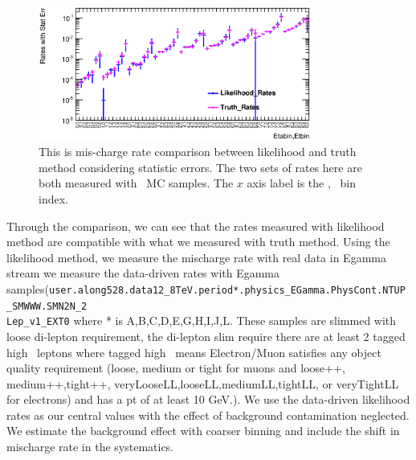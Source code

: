 \begin{figure}[htp]
\centering
\includegraphics[width=0.8\textwidth]{figures/ChargeMisID/LL_TR_Com.eps}
\caption{This is mis-charge rate comparison between likelihood and
  truth method considering statistic errors. The two sets of rates
  here are both measured with \Zee\ MC samples. The $x$ axis label is
  the \eta, \pt\ bin index.}
\label{fig:LL_Truth_Comparison}
\end{figure}  

Through the comparison, we can see that the rates measured with
likelihood method are compatible with what we measured with truth
method. Using the likelihood method, we measure the mischarge rate
with real data in Egamma stream we measure the data-driven rates with
Egamma
samples(\texttt{user.along528.data12\_8TeV.period*.physics\_EGamma.PhysCont.NTUP\_SMWWW.SMN2N\_2\\Lep\_v1\_EXT0}
where * is A,B,C,D,E,G,H,I,J,L. These samples are slimmed with loose
di-lepton requirement, the di-lepton slim require there are at least 2
tagged high \pt\ leptons where tagged high \pt\ means Electron/Muon
satisfies any object quality requirement (loose, medium or tight for
muons and loose++,\\medium++,tight++,
veryLooseLL,looseLL,mediumLL,tightLL, or veryTightLL for electrons)
and has a pt of at least 10 GeV.). We use the data-driven likelihood
rates as our central values with the effect of background
contamination neglected. We estimate the background effect with
coarser binning and include the shift in mischarge rate in the
systematics.


